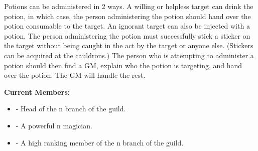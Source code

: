\documentclass[blue]{NeptuneBall}
\begin{document}
Potions can be administered in 2 ways. A willing or helpless target can drink the potion, in which case, the person administering the potion should hand over the potion consumable to the target. An ignorant target can also be injected with a potion. The person administering the potion must successfully stick a sticker on the target without being caught in the act by the target or anyone else. (Stickers can be acquired at the cauldrons.) The person who is attempting to administer a potion should then find a GM, explain who the potion is targeting, and hand over the potion. The GM will handle the rest.

{\bf Current Members:}
\begin{itemize}
\item \cManta{} - Head of the \pAtlantis{}n branch of the guild.
\item \cWitch{\MYname} - A powerful \pAtlantis{}n magician.
\item \cBodyguard{} - A high ranking member of the \pPacifica{}n branch of the guild.
\end{itemize}
\end{document}
